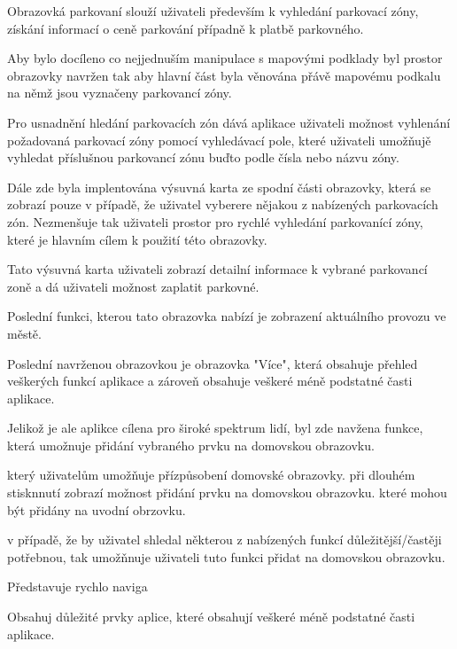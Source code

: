 \begin{minipage}[t]{0.45\textwidth}
Obrazovká parkovaní slouží uživateli především k vyhledání parkovací zóny, získání informací o ceně parkování případně k platbě parkovného.

Aby bylo docíleno co nejjednuším manipulace s mapovými podklady byl prostor obrazovky navržen tak aby hlavní část byla věnována přávě mapovému
podkalu na němž jsou vyznačeny parkovancí zóny. 

Pro usnadnění hledání parkovacích zón dává aplikace uživateli možnost vyhlenání požadovaná parkovací zóny pomocí vyhledávací pole, které 
uživateli umožňujě vyhledat příslušnou parkovancí zónu buďto podle čísla nebo názvu zóny. 

Dále zde byla implentována výsuvná karta ze spodní části obrazovky, která se zobrazí pouze v případě, že uživatel vyberere nějakou
z nabízených parkovacích zón. Nezmenšuje tak uživateli prostor pro rychlé vyhledání parkovanící zóny, které je hlavním cílem k použití této obrazovky. 

Tato výsuvná karta uživateli zobrazí detailní informace k vybrané parkovancí zoně a dá uživateli možnost zaplatit parkovné.

Poslední funkci, kterou tato obrazovka nabízí je zobrazení aktuálního provozu ve městě. 


\bigskip
{}
Poslední navrženou obrazovkou je obrazovka "Více", která obsahuje přehled veškerých funkcí aplikace a zároveň obsahuje veškeré méně podstatné 
časti aplikace.

Jelikož je ale aplikce cílena pro široké spektrum lidí, byl zde navžena funkce, která umožnuje přidání vybraného prvku na domovskou obrazovku.


který uživatelům umožňuje přízpůsobení domovské obrazovky.
při dlouhém stisknnutí zobrazí možnost přidání prvku na domovskou obrazovku.
které mohou být přidány na uvodní obrzovku.


v případě, že by uživatel shledal některou 
z nabízených funkcí důležitější/častěji potřebnou, tak umožňnuje uživateli tuto funkci přidat na domovskou obrazovku.

Představuje rychlo naviga

Obsahuj důležité prvky aplice, které obsahují veškeré méně podstatné časti aplikace.
\end{minipage}
\hfill
